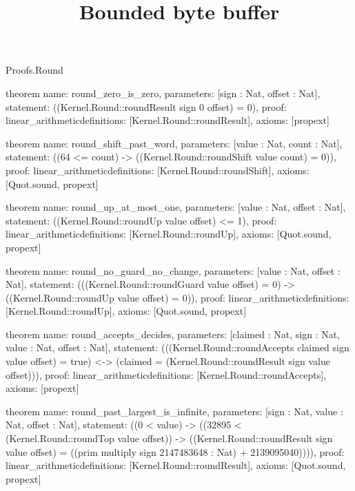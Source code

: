 \begin{lexlean}{Proofs.Round}
\title{Bounded byte buffer}
\begin{semanticmodule}
theorem{
  name: round_zero_is_zero,
  parameters: [sign : Nat, offset : Nat],
  statement: ((Kernel.Round::roundResult sign 0 offset) = 0),
  proof: linear_arithmetic{definitions: [Kernel.Round::roundResult]},
  axioms: [propext]
}

theorem{
  name: round_shift_past_word,
  parameters: [value : Nat, count : Nat],
  statement: ((64 <= count) -> ((Kernel.Round::roundShift value count) = 0)),
  proof: linear_arithmetic{definitions: [Kernel.Round::roundShift]},
  axioms: [Quot.sound, propext]
}

theorem{
  name: round_up_at_most_one,
  parameters: [value : Nat, offset : Nat],
  statement: ((Kernel.Round::roundUp value offset) <= 1),
  proof: linear_arithmetic{definitions: [Kernel.Round::roundUp]},
  axioms: [Quot.sound, propext]
}

theorem{
  name: round_no_guard_no_change,
  parameters: [value : Nat, offset : Nat],
  statement: (((Kernel.Round::roundGuard value offset) = 0) -> ((Kernel.Round::roundUp value offset) = 0)),
  proof: linear_arithmetic{definitions: [Kernel.Round::roundUp]},
  axioms: [Quot.sound, propext]
}

theorem{
  name: round_accepts_decides,
  parameters: [claimed : Nat, sign : Nat, value : Nat, offset : Nat],
  statement: (((Kernel.Round::roundAccepts claimed sign value offset) = true) <-> (claimed = (Kernel.Round::roundResult sign value offset))),
  proof: linear_arithmetic{definitions: [Kernel.Round::roundAccepts]},
  axioms: [propext]
}

theorem{
  name: round_past_largest_is_infinite,
  parameters: [sign : Nat, value : Nat, offset : Nat],
  statement: ((0 < value) -> ((32895 < (Kernel.Round::roundTop value offset)) -> ((Kernel.Round::roundResult sign value offset) = ((prim multiply sign 2147483648 : Nat) + 2139095040)))),
  proof: linear_arithmetic{definitions: [Kernel.Round::roundResult]},
  axioms: [Quot.sound, propext]
}
\end{semanticmodule}
\end{lexlean}
